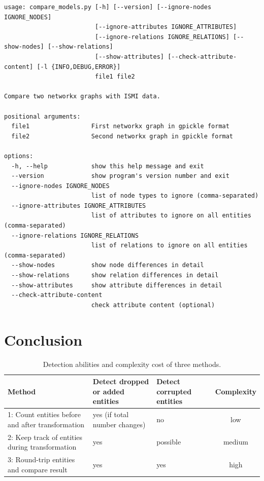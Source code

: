 \documentclass[final]{anthology-ch} %
\begin{document}
\begin{listing}
\begin{verbatim}
usage: compare_models.py [-h] [--version] [--ignore-nodes IGNORE_NODES]
                         [--ignore-attributes IGNORE_ATTRIBUTES]
                         [--ignore-relations IGNORE_RELATIONS] [--show-nodes] [--show-relations]
                         [--show-attributes] [--check-attribute-content] [-l {INFO,DEBUG,ERROR}]
                         file1 file2

Compare two networkx graphs with ISMI data.

positional arguments:
  file1                 First networkx graph in gpickle format
  file2                 Second networkx graph in gpickle format

options:
  -h, --help            show this help message and exit
  --version             show program's version number and exit
  --ignore-nodes IGNORE_NODES
                        list of node types to ignore (comma-separated)
  --ignore-attributes IGNORE_ATTRIBUTES
                        list of attributes to ignore on all entities (comma-separated)
  --ignore-relations IGNORE_RELATIONS
                        list of relations to ignore on all entities (comma-separated)
  --show-nodes          show node differences in detail
  --show-relations      show relation differences in detail
  --show-attributes     show attribute differences in detail
  --check-attribute-content
                        check attribute content (optional)
\end{verbatim}
  \label{code:ismi-compare}
\end{listing}


\section{Conclusion}

\begin{table}[h]
  \centering
  \begin{tabular}{>{\raggedright}p{} >{\centering}p{} >{\centering}p{} c}
    Method & Detect dropped or added entities & Detect corrupted entities & Complexity \\ \midrule
    1: Count entities before and after transformation & yes (if total number changes) & no & low \\ \midrule
    2: Keep track of entities during transformation & yes & possible & medium \\ \midrule
    3: Round-trip entities and compare result & yes & yes & high \\ \bottomrule
  \end{tabular}
  \caption{Detection abilities and complexity cost of three methods.}
  \label{tab:method-abilities}
\end{table}
\end{document}
